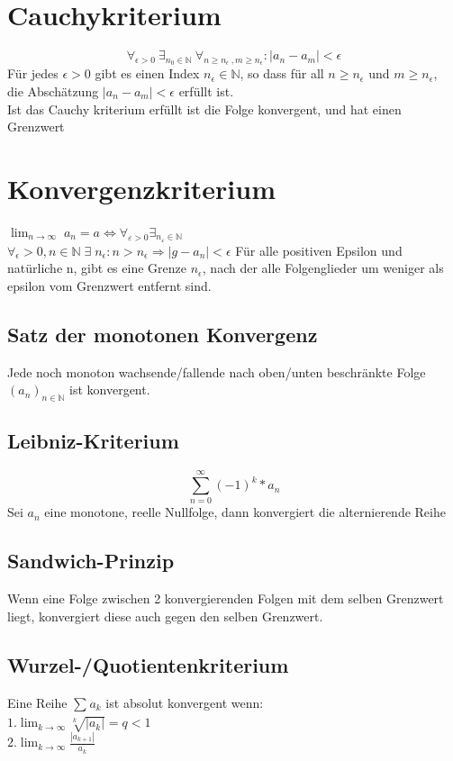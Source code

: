 \documentclass[12pt,a4paper]{article}
\begin{document}
\section{Cauchykriterium}
	$$\forall_{\epsilon>0}~\exists_{n_{0}\in\mathbb{N}} ~\forall_{n \geq n_{\epsilon}~, m \geq n_{\epsilon}}: | a_{n}-a_{m} | < \epsilon$$
	Für jedes $\epsilon > 0$ gibt es einen Index $n_{\epsilon} \in \mathbb{N}$, so dass für all $n\geq n_{\epsilon}$ und $m\geq n_{\epsilon}$,\\
	die Abschätzung $| a_{n}-a_{m} | < \epsilon$ erfüllt ist.\\
	Ist das Cauchy kriterium erfüllt ist die Folge konvergent, und hat einen Grenzwert

\section{Konvergenzkriterium}
	$\lim_{n \to \infty} \; a_n = a \Leftrightarrow \forall_{\varepsilon > 0} \exists _{n_\varepsilon \in  \mathbb{N}}$\\
	$\forall_\epsilon > 0, n \in \mathbb{N}\; \exists\; n_\epsilon: n > n_\epsilon \Rightarrow |g-a_n| < \epsilon $
	Für alle positiven Epsilon und natürliche n, gibt es eine Grenze $n_\epsilon $, nach der alle Folgenglieder um weniger als epsilon vom Grenzwert entfernt sind.\\ 

	\subsection{Satz der monotonen Konvergenz}
		Jede noch monoton wachsende/fallende nach oben/unten beschränkte Folge $(a_n)_{n \in \mathbb{N}}$ ist konvergent.\\

	\subsection{Leibniz-Kriterium}
		$$\sum^{\infty}_{n=0}{(-1)^k *a_n}$$
		Sei $a_n$ eine monotone, reelle Nullfolge, dann konvergiert die alternierende Reihe

	\subsection{Sandwich-Prinzip}
		Wenn eine Folge zwischen 2 konvergierenden Folgen mit dem selben Grenzwert liegt, konvergiert diese auch gegen den selben Grenzwert.

	\subsection{Wurzel-/Quotientenkriterium}
		Eine Reihe $ \sum_{}^{} a_k  $ ist absolut konvergent wenn:\\
		$1. \lim_{k \to \infty} \sqrt[k]{|a_k|}  = q < 1$\\
		$2. \lim_{k \to \infty} \frac{|a_{k+1}|}{a_k} $
		
\end{document}
